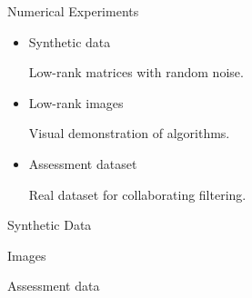 \documentclass{beamer}
\begin{document}
\begin{frame}{Numerical Experiments}
\begin{itemize}
	\item Synthetic data
	
	Low-rank matrices with random noise.
	\item Low-rank images
	
	Visual demonstration of algorithms.
	\item Assessment dataset
	
	Real dataset for collaborating filtering.
\end{itemize}

\end{frame}
\begin{frame}{Synthetic Data}

\end{frame}
\begin{frame}{Images}
	
\end{frame}
\begin{frame}{Assessment data}
	
\end{frame}
\end{document}
